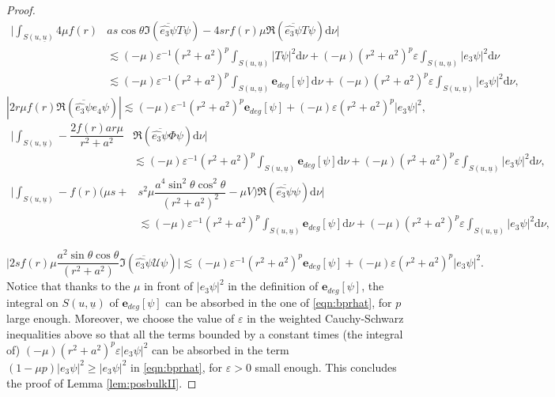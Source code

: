 \documentclass[reqno]{amsart}
\numberwithin{equation}{section}
\newcommand{\intS}{\int_{S(u,\ubar)}}
\newcommand{\ubar}{{\underline{u}}}
\newcommand{\dee}{\mathrm{d}}
\newcommand{\ener}{\mathbf{e}}
\newcommand{\ethat}{\widehat{e_3}}
\theoremstyle{plain}
\theoremstyle{definition}
\theoremstyle{remark}
\numberwithin{equation}{section}
\begin{document}
\begin{proof}
\begin{align*}
    \Bigg|\intS4\mu f(r)&as\cos\theta\mathfrak{I}(\overline{\ethat\psi}T\psi)-4srf(r)\mu\mathfrak{R}(\overline{\ethat\psi}T\psi)\dee\nu\Bigg|\\
    &\lesssim(-\mu)\varepsilon^{-1}(r^2+a^2)^p\intS|T\psi|^2\dee\nu+(-\mu)(r^2+a^2)^p\varepsilon\intS|e_3\psi|^2\dee\nu\\
    &\lesssim(-\mu)\varepsilon^{-1}(r^2+a^2)^p\intS\ener_{deg}[\psi]\dee\nu+(-\mu)(r^2+a^2)^p\varepsilon\intS|e_3\psi|^2\dee\nu,
\end{align*}
$$|2r\mu f(r)\mathfrak{R}(\overline{\ethat\psi}e_4\psi)|\lesssim(-\mu)\varepsilon^{-1}(r^2+a^2)^p\ener_{deg}[\psi]+(-\mu)\varepsilon (r^2+a^2)^p|e_3\psi|^2,$$
\begin{align*}
    \Bigg|\intS-\dfrac{2f(r)ar\mu}{r^2+a^2}&\mathfrak{R}(\overline{\ethat\psi}\Phi\psi)\dee\nu\Bigg|\\
    &\lesssim(-\mu)\varepsilon^{-1}(r^2+a^2)^p\intS\ener_{deg}[\psi]\dee\nu+(-\mu)(r^2+a^2)^p\varepsilon\intS|e_3\psi|^2\dee\nu,
\end{align*}
\begin{align*}
    \Bigg|\intS-f(r)\Bigg(\mu s+&s^2\mu\dfrac{a^4\sin^2\theta\cos^2\theta}{(r^2+a^2)^2}-\mu V\Bigg)\mathfrak{R}(\overline{\ethat\psi}\psi)\dee\nu\Bigg|\\
    &\lesssim(-\mu)\varepsilon^{-1}(r^2+a^2)^p\intS\ener_{deg}[\psi]\dee\nu+(-\mu)(r^2+a^2)^p\varepsilon\intS|e_3\psi|^2\dee\nu,
\end{align*}

$$\Bigg|2sf(r)\mu\dfrac{a^2\sin\theta\cos\theta}{(r^2+a^2)}\mathfrak{I}(\overline{\ethat\psi}\mathcal{U}\psi)\Bigg|\lesssim(-\mu)\varepsilon^{-1}(r^2+a^2)^p\ener_{deg}[\psi]+(-\mu)\varepsilon(r^2+a^2)^p|e_3\psi|^2.$$
Notice that thanks to the $\mu$ in front of $|e_3\psi|^2$ in the definition of $\ener_{deg}[\psi]$, the integral on ${S(u,\ubar)}$ of $\ener_{deg}[\psi]$ can be absorbed in the one of \eqref{eqn:bprhat}, for $p$ large enough. Moreover, we choose the value of $\varepsilon$ in the weighted Cauchy-Schwarz inequalities above so that all the terms bounded by a constant times (the integral of) $(-\mu)(r^2+a^2)^p\varepsilon|e_3\psi|^2$ can be absorbed in the term $(1-\mu p)|e_3\psi|^2\geq|e_3\psi|^2$ in \eqref{eqn:bprhat}, for $\varepsilon>0$ small enough. This concludes the proof of Lemma \ref{lem:posbulkII}.

\end{proof}
\end{document}
